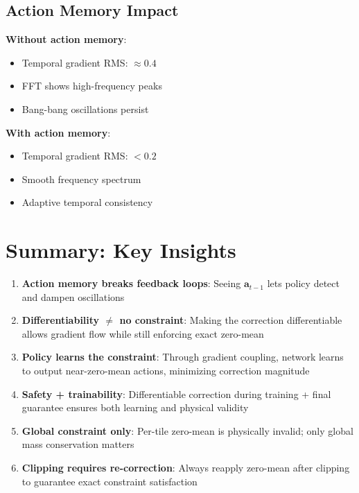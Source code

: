 \documentclass[11pt,a4paper]{article}
\theoremstyle{definition}
\begin{document}
\subsection{Action Memory Impact}

\textbf{Without action memory}:
\begin{itemize}
    \item Temporal gradient RMS: $\approx 0.4$
    \item FFT shows high-frequency peaks
    \item Bang-bang oscillations persist
\end{itemize}

\textbf{With action memory}:
\begin{itemize}
    \item Temporal gradient RMS: $< 0.2$
    \item Smooth frequency spectrum
    \item Adaptive temporal consistency
\end{itemize}

\section{Summary: Key Insights}

\begin{enumerate}
    \item \textbf{Action memory breaks feedback loops}: Seeing $\mathbf{a}_{t-1}$ lets policy detect and dampen oscillations

    \item \textbf{Differentiability $\neq$ no constraint}: Making the correction differentiable allows gradient flow while still enforcing exact zero-mean

    \item \textbf{Policy learns the constraint}: Through gradient coupling, network learns to output near-zero-mean actions, minimizing correction magnitude

    \item \textbf{Safety + trainability}: Differentiable correction during training + final guarantee ensures both learning and physical validity

    \item \textbf{Global constraint only}: Per-tile zero-mean is physically invalid; only global mass conservation matters

    \item \textbf{Clipping requires re-correction}: Always reapply zero-mean after clipping to guarantee exact constraint satisfaction
\end{enumerate}
\end{document}
